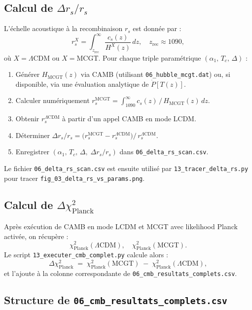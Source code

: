\subsection{Calcul de \(\Delta r_{s}/r_{s}\)}
L’échelle acoustique à la recombinaison \(r_{s}\) est donnée par :
\[
  r_{s}^{X} 
  = 
  \int_{z_{\mathrm{rec}}}^{\infty} \frac{c_{s}(z)}{H^{X}(z)}\,dz,
  \quad
  z_{\mathrm{rec}}\approx1090,
\]
où \(X=\Lambda\mathrm{CDM}\) ou \(X=\mathrm{MCGT}\).  
Pour chaque triple paramétrique \((\alpha_{1},\,T_{c},\,\Delta)\) :
\begin{enumerate}
  \item Générer \(H_{\mathrm{MCGT}}(z)\) via CAMB (utilisant \texttt{06\_hubble\_mcgt.dat})
        ou, si disponible, via une évaluation analytique de \(\dot P[T(z)]\).
  \item Calculer numériquement
        \(\displaystyle r_{s}^{\mathrm{MCGT}} 
         = \int_{1090}^{\infty} c_{s}(z)\,/\,H_{\mathrm{MCGT}}(z)\,dz.\)
  \item Obtenir \(r_{s}^{\Lambda\mathrm{CDM}}\) à partir d’un appel CAMB en mode LCDM.
  \item Déterminer
        \(\displaystyle
          \Delta r_{s}/r_{s}
          = 
          \bigl(r_{s}^{\mathrm{MCGT}} - r_{s}^{\Lambda\mathrm{CDM}}\bigr)
/\,r_{s}^{\Lambda\mathrm{CDM}}.\)
  \item Enregistrer \((\alpha_{1},\,T_{c},\,\Delta,\;\Delta r_{s}/r_{s})\) 
        dans \texttt{06\_delta\_rs\_scan.csv}.
\end{enumerate}
Le fichier \texttt{06\_delta\_rs\_scan.csv} est ensuite utilisé par 
\texttt{13\_tracer\_delta\_rs.py} pour tracer 
\texttt{fig\_03\_delta\_rs\_vs\_params.png}.

\subsection{Calcul de \(\Delta\chi^{2}_{\mathrm{Planck}}\)}
Après exécution de CAMB en mode LCDM et MCGT avec likelihood Planck activée, on récupère :
\[
  \chi^{2}_{\mathrm{Planck}}(\Lambda\mathrm{CDM}), 
  \quad
  \chi^{2}_{\mathrm{Planck}}(\mathrm{MCGT}).
\]
Le script \texttt{13\_executer\_cmb\_complet.py} calcule alors :
\[
  \Delta\chi^{2}_{\mathrm{Planck}}
  \;=\;
  \chi^{2}_{\mathrm{Planck}}(\mathrm{MCGT})
  \;-\;
  \chi^{2}_{\mathrm{Planck}}(\Lambda\mathrm{CDM}),
\]
et l’ajoute à la colonne correspondante de 
\texttt{06\_cmb\_resultats\_complets.csv}.

\subsection{Structure de \texttt{06\_cmb\_resultats\_complets.csv}}


